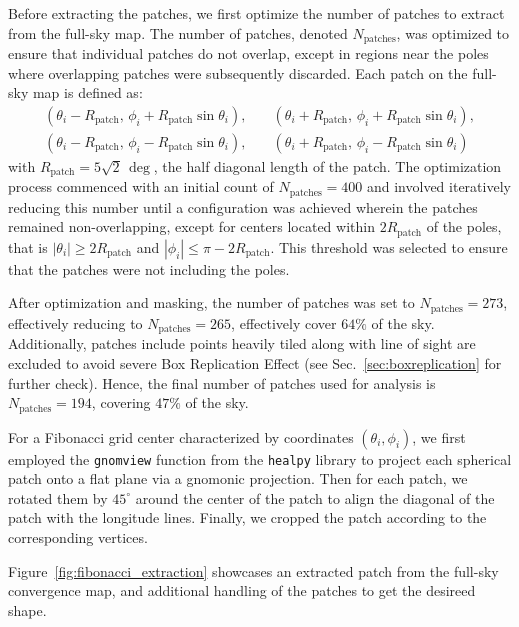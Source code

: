Before extracting the patches, we first optimize the number of patches to extract from the full-sky map. The number of patches, denoted \( N_{\text{patches}} \), was optimized to ensure that individual patches do not overlap, except in regions near the poles where overlapping patches were subsequently discarded. 
Each patch on the full-sky map is defined as:
\begin{align}
    \left( \theta_i - R_{\text{patch}},\, \phi_i + R_{\text{patch}} \sin \theta_i \right),  \quad & \left( \theta_i + R_{\text{patch}},\, \phi_i + R_{\text{patch}} \sin \theta_i \right), \nonumber \\
    \left( \theta_i - R_{\text{patch}},\, \phi_i - R_{\text{patch}} \sin \theta_i \right), \quad &
    \left( \theta_i + R_{\text{patch}},\, \phi_i - R_{\text{patch}} \sin \theta_i \right)
\end{align}
with \( R_{\text{patch}} = 5\sqrt{2}\, \mathrm{\deg} \), the half diagonal length of the patch.
The optimization process commenced with an initial count of \( N_{\text{patches}} = 400 \) and involved iteratively reducing this number until a configuration was achieved wherein the patches remained non-overlapping, except for centers located within \( 2R_{\text{patch}}\) of the poles, that is $|\theta_i| \geq 2R_{\text{patch}}$ and $|\phi_i| \leq \pi - 2R_{\text{patch}}$. This threshold was selected to ensure that the patches were not including the poles.

After optimization and masking, the number of patches was set to $N_{\text{patches}} = 273$, effectively reducing to $N_{\text{patches}} = 265$, effectively cover $64 \%$ of the sky. Additionally, patches include points heavily tiled along with line of sight are excluded to avoid severe Box Replication Effect (see Sec.~\ref{sec:boxreplication} for further check). Hence, the final number of patches used for analysis is $N_{\text{patches}} = 194$, covering $47 \%$ of the sky.

For a Fibonacci grid center characterized by coordinates \( (\theta_i, \phi_i) \), we first employed the \texttt{gnomview} function from the \texttt{healpy} library \citep{Zonca2019} to project each spherical patch onto a flat plane via a gnomonic projection. Then for each patch, we rotated them by $45^\circ$ around the center of the patch to align the diagonal of the patch with the longitude lines. Finally, we cropped the patch according to the corresponding vertices.

Figure~\ref{fig:fibonacci_extraction} showcases an extracted patch from the full-sky convergence map, and additional handling of the patches to get the desireed shape.

